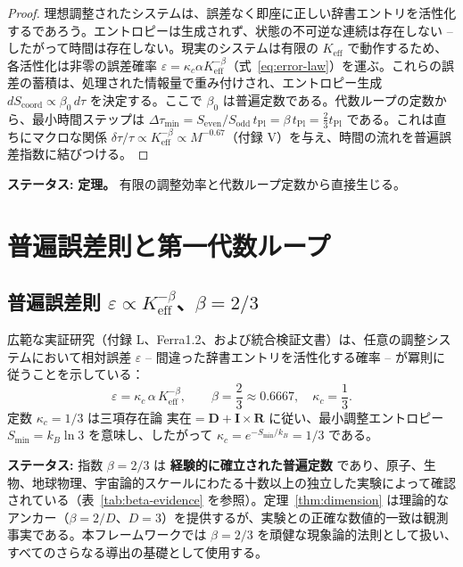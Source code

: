 \documentclass[12pt,a4paper]{article}
\begin{document}
	\begin{proof}
		理想調整されたシステムは、誤差なく即座に正しい辞書エントリを活性化するであろう。エントロピーは生成されず、状態の不可逆な連続は存在しない – したがって時間は存在しない。現実のシステムは有限の \(K_{\mathrm{eff}}\) で動作するため、各活性化は非零の誤差確率 \(\varepsilon = \kappa_c \alpha K_{\mathrm{eff}}^{-\beta}\)（式~\ref{eq:error-law}）を運ぶ。これらの誤差の蓄積は、処理された情報量で重み付けされ、エントロピー生成 \(dS_{\mathrm{coord}} \propto \beta_0 \, d\tau\) を決定する。ここで \(\beta_0\) は普遍定数である。代数ループの定数から、最小時間ステップは \(\Delta \tau_{\min} = S_{\mathrm{even}}/S_{\mathrm{odd}} \, t_{\mathrm{Pl}} = \beta \, t_{\mathrm{Pl}} = \frac{2}{3} t_{\mathrm{Pl}}\) である。これは直ちにマクロな関係 \(\delta\tau/\tau \propto K_{\mathrm{eff}}^{-\beta} \propto M^{-0.67}\)（付録 V）を与え、時間の流れを普遍誤差指数に結びつける。
	\end{proof}
	
	\textbf{ステータス:} \textbf{定理。} 有限の調整効率と代数ループ定数から直接生じる。
	
	\section{普遍誤差則と第一代数ループ}
	\label{sec:error-law}
	
	\subsection{普遍誤差則 \(\varepsilon \propto K_{\mathrm{eff}}^{-\beta}\)、\(\beta = 2/3\)}
	
	広範な実証研究（付録 L、Ferra1.2、および統合検証文書）は、任意の調整システムにおいて相対誤差 \(\varepsilon\) – 間違った辞書エントリを活性化する確率 – が冪則に従うことを示している：
	\begin{equation}
		\boxed{\varepsilon = \kappa_c \, \alpha \, K_{\mathrm{eff}}^{-\beta}, \qquad \beta = \frac{2}{3} \approx 0.6667,\quad \kappa_c = \frac{1}{3}}.
		\label{eq:error-law}
	\end{equation}
	定数 \(\kappa_c = 1/3\) は三項存在論 \(\text{実在} = \mathbf{D} + \mathbf{I} \times \mathbf{R}\) に従い、最小調整エントロピー \(S_{\min} = k_B \ln 3\) を意味し、したがって \(\kappa_c = e^{-S_{\min}/k_B} = 1/3\) である。
	
	\textbf{ステータス:} 指数 \(\beta = 2/3\) は \textbf{経験的に確立された普遍定数} であり、原子、生物、地球物理、宇宙論的スケールにわたる十数以上の独立した実験によって確認されている（表~\ref{tab:beta-evidence} を参照）。定理~\ref{thm:dimension} は理論的なアンカー（\(\beta = 2/D\)、\(D=3\)）を提供するが、実験との正確な数値的一致は観測事実である。本フレームワークでは \(\beta = 2/3\) を頑健な現象論的法則として扱い、すべてのさらなる導出の基礎として使用する。
	
\end{document}

